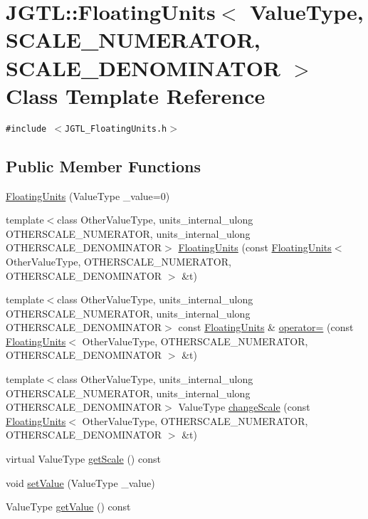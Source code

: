 \hypertarget{class_j_g_t_l_1_1_floating_units}{
\section{JGTL::Floating\-Units$<$ Value\-Type, SCALE\_\-NUMERATOR, SCALE\_\-DENOMINATOR $>$ Class Template Reference}
\label{class_j_g_t_l_1_1_floating_units}
}
{\tt \#include $<$JGTL\_\-Floating\-Units.h$>$}

\subsection*{Public Member Functions}
\begin{CompactItemize}
\item 
\hyperlink{class_j_g_t_l_1_1_floating_units_4f7658a1fa622c855a6c5923eb5add64}{Floating\-Units} (Value\-Type \_\-value=0)
\item 
template$<$class Other\-Value\-Type, units\_\-internal\_\-ulong OTHERSCALE\_\-NUMERATOR, units\_\-internal\_\-ulong OTHERSCALE\_\-DENOMINATOR$>$ \hyperlink{class_j_g_t_l_1_1_floating_units_0a786872a5e5665fd87998c4df382753}{Floating\-Units} (const \hyperlink{class_j_g_t_l_1_1_floating_units}{Floating\-Units}$<$ Other\-Value\-Type, OTHERSCALE\_\-NUMERATOR, OTHERSCALE\_\-DENOMINATOR $>$ \&t)
\item 
template$<$class Other\-Value\-Type, units\_\-internal\_\-ulong OTHERSCALE\_\-NUMERATOR, units\_\-internal\_\-ulong OTHERSCALE\_\-DENOMINATOR$>$ const \hyperlink{class_j_g_t_l_1_1_floating_units}{Floating\-Units} \& \hyperlink{class_j_g_t_l_1_1_floating_units_0c909f9f4b76403e848172b65a0c418a}{operator=} (const \hyperlink{class_j_g_t_l_1_1_floating_units}{Floating\-Units}$<$ Other\-Value\-Type, OTHERSCALE\_\-NUMERATOR, OTHERSCALE\_\-DENOMINATOR $>$ \&t)
\item 
template$<$class Other\-Value\-Type, units\_\-internal\_\-ulong OTHERSCALE\_\-NUMERATOR, units\_\-internal\_\-ulong OTHERSCALE\_\-DENOMINATOR$>$ Value\-Type \hyperlink{class_j_g_t_l_1_1_floating_units_c7e85ddf1877abac6e7a77f035d68a1b}{change\-Scale} (const \hyperlink{class_j_g_t_l_1_1_floating_units}{Floating\-Units}$<$ Other\-Value\-Type, OTHERSCALE\_\-NUMERATOR, OTHERSCALE\_\-DENOMINATOR $>$ \&t)
\item 
virtual Value\-Type \hyperlink{class_j_g_t_l_1_1_floating_units_38ce55dd061c7b566f2a146ad062816a}{get\-Scale} () const
\item 
void \hyperlink{class_j_g_t_l_1_1_floating_units_b4f0691c805340b545251b6216a406f3}{set\-Value} (Value\-Type \_\-value)
\item 
Value\-Type \hyperlink{class_j_g_t_l_1_1_floating_units_0151027d566bdf3be45f2f8830d26664}{get\-Value} () const
\end{CompactItemize}
